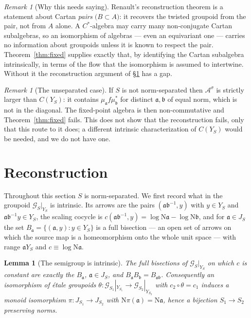 \documentclass[11pt]{amsart}
\numberwithin{equation}{section}
\newtheorem{lemma}[theorem]{Lemma}
\theoremstyle{definition}
\theoremstyle{remark}
\newtheorem{remark}[theorem]{Remark}
\newcommand{\cA}{\mathcal{A}}
\newcommand{\cG}{\mathcal{G}}
\newcommand{\aaa}{\mathfrak{a}}
\newcommand{\bb}{\mathfrak{b}}
\newcommand{\Ns}{\mathrm{N}}
\begin{document}
\begin{remark}[Why this needs saying]\label{rem:whyneeded}
Renault's reconstruction theorem is a statement about Cartan \emph{pairs}
$\bigl(B\subset A\bigr)$: it recovers the twisted groupoid from the pair, not from $A$ alone.
A $C^*$-algebra may carry many non-conjugate Cartan subalgebras, so an isomorphism of algebras
--- even an equivariant one --- carries no information about groupoids unless it is known to
respect the pair. Theorem~\ref{thm:fixed} supplies exactly that, by identifying the Cartan
subalgebra intrinsically, in terms of the flow that the isomorphism is assumed to intertwine.
Without it the reconstruction argument of \S\ref{sec:rec} has a gap.
\end{remark}

\begin{remark}[The unseparated case]\label{rem:unsep}
If $S$ is not norm-separated then $\cA^\sigma$ is strictly larger than $C(Y_S)$: it contains
$\mu_\aaa f\mu_{\bb}^*$ for distinct $\aaa,\bb$ of equal norm, which is not in the diagonal.
The fixed-point algebra is then non-commutative and Theorem~\ref{thm:fixed} fails. This does not
show that the reconstruction fails, only that this route to it does; a different intrinsic
characterization of $C(Y_S)$ would be needed, and we do not have one.
\end{remark}

\section{Reconstruction}\label{sec:rec}

Throughout this section $S$ is norm-separated. We first record what in the groupoid
$\cG_S|_{Y_S}$ is intrinsic. Its arrows are the pairs $(\aaa\bb^{-1},y)$ with $y\in Y_S$ and
$\aaa\bb^{-1}y\in Y_S$, the scaling cocycle is $c(\aaa\bb^{-1},y)=\log\Ns\aaa-\log\Ns\bb$,
and for $\aaa\in J_S$ the set $B_\aaa=\{(\aaa,y):y\in Y_S\}$ is a full bisection --- an
open set of arrows on which the source map is a homeomorphism onto the whole unit space
--- with range $\aaa Y_S$ and $c\equiv\log\Ns\aaa$.

\begin{lemma}[The semigroup is intrinsic]\label{lem:bisections}
The full bisections of $\cG_S|_{Y_S}$ on which $c$ is constant are exactly the $B_\aaa$,
$\aaa\in J_S$, and $B_\aaa B_\bb=B_{\aaa\bb}$. Consequently an isomorphism of \'etale
groupoids $\theta:\cG_{S_1}|_{Y_{S_1}}\to\cG_{S_2}|_{Y_{S_2}}$ with $c_2\circ\theta=c_1$ induces a
monoid isomorphism $\pi:J_{S_1}\to J_{S_2}$ with $\Ns\pi(\aaa)=\Ns\aaa$, hence a bijection
$S_1\to S_2$ preserving norms.
\end{lemma}
\end{document}
